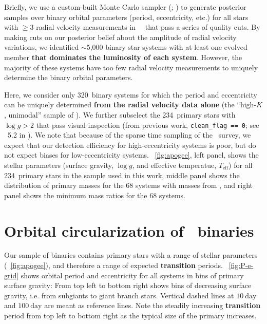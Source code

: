 \documentclass[modern, letterpaper]{aastex62}
\newcommand{\apogee}{\project{\acronym{APOGEE}}}
\newcommand{\DR}{\acronym{DR14}}
\newcommand{\logg}{\ensuremath{\log g}}
\newcommand{\nunimodal}{320}
\newcommand{\nclean}{234}
\renewcommand{\changes}[1]{\textbf{#1}}
\begin{document}
Briefly, we use a custom-built Monte Carlo sampler (;
\citealt{Price-Whelan:2017}) to generate posterior samples over binary orbital
parameters (period, eccentricity, etc.) for all stars with $\geq 3$ radial
velocity measurements in \apogee\ \DR\ that pass a series of quality cuts.
By making cuts on our posterior belief about the amplitude of radial velocity
variations, we identified $\sim$5,000 binary star systems with at least one
evolved member \changes{that dominates the luminosity of each system}.
However, the majority of these systems have too few radial velocity measurements
to uniquely determine the binary orbital parameters.

Here, we consider only \nunimodal\ binary systems for which the period and
eccentricity can be uniquely determined \changes{from the radial velocity data
alone} (the ``high-$K$, unimodal'' sample of \citealt{Price-Whelan:2018}).
We further subselect the \nclean\ primary stars with $\logg > 2$ that pass
visual inspection (from previous work, \texttt{clean\_flag == 0}; see
\sectionname~5.2 in \citealt{Price-Whelan:2018}).
We note that because of the sparse time sampling of the \apogee\ survey, we
expect that our detection efficiency for high-eccentricity systems is poor, but
do not expect biases for low-eccentricity systems.
\figurename~\ref{fig:apogee}, left panel, shows the stellar parameters (surface
gravity, $\log g$, and effective temperatue, $T_{\textrm{eff}}$) for all
\nclean\ primary stars in the sample used in this work, middle panel shows the
distribution of primary masses for the 68 systems with masses from
\cite{Ness:2016}, and right panel shows the minimum mass ratios for the 68
systems.


\section{Orbital circularization of \apogee\ binaries}
\label{sec:results}

Our sample of binaries contains primary stars with a range of stellar parameters
(\figurename~\ref{fig:apogee}), and therefore a range of expected
\changes{transition} periods.
\figurename~\ref{fig:P-e-grid} shows orbital period and eccentricity for all
systems in bins of primary surface gravity:
From top left to bottom right shows bins of decreasing surface gravity, i.e.
from subgiants to giant branch stars.
Vertical dashed lines at $10~\textrm{day}$ and $100~\textrm{day}$ are meant as
reference lines.
Note the steadily increasing \changes{transition} period from top left to bottom
right as the typical size of the primary increases.
\end{document}
